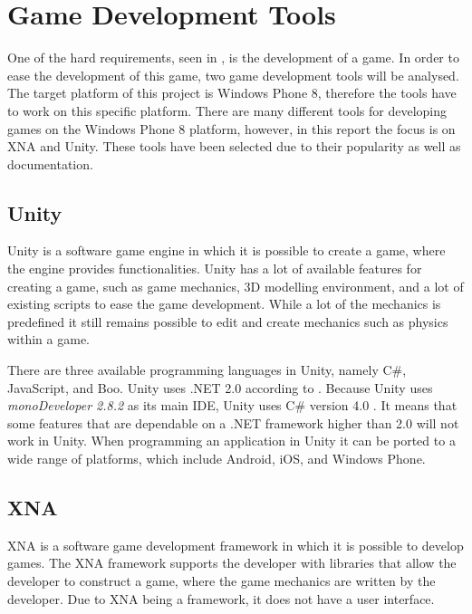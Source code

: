 \section{Game Development Tools}\label{section:game-development-tools}
One of the hard requirements, seen in , is the development of a game. 
In order to ease the development of this game, two game development tools will be analysed.
The target platform of this project is Windows Phone 8, therefore the tools have to work on this specific platform.
There are many different tools for developing games on the Windows Phone 8 platform, however, in this report the focus is on XNA and Unity.
These tools have been selected due to their popularity as well as documentation.


\subsection{Unity}\label{subsection:unity}
Unity is a software game engine in which it is possible to create a game, where the engine provides functionalities.
Unity has a lot of available features for creating a game, such as game mechanics, 3D modelling environment, and a lot of existing scripts to ease the game development.
While a lot of the mechanics is predefined it still remains possible to edit and create mechanics such as physics within a game.

There are three available programming languages in Unity, namely C\#, JavaScript, and Boo.
Unity uses .NET 2.0 according to \citet{misc:UnityNet}. 
Because Unity uses \textit{monoDeveloper 2.8.2} as its main IDE, Unity uses C\# version 4.0 \citep{misc:MonoVersion}.
It means that some features that are dependable on a .NET framework higher than 2.0 will not work in Unity.
When programming an application in Unity it can be ported to a wide range of platforms, which include Android, iOS, and Windows Phone.


\subsection{XNA}
XNA is a software game development framework in which it is possible to develop games.
The XNA framework supports the developer with libraries that allow the developer to construct a game, where the game mechanics are written by the developer.
Due to XNA being a framework, it does not have a user interface.

